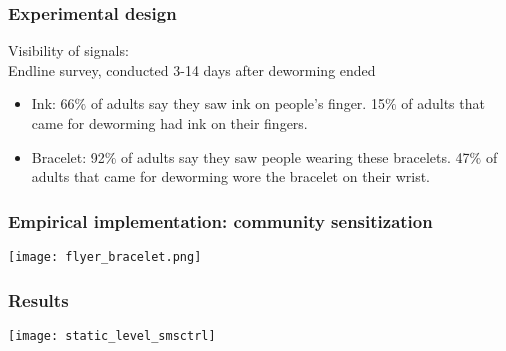 \documentclass{beamer}
\theoremstyle{plain}
\begin{document}
\begin{frame}[label=slide16]
\frametitle{\large{Experimental design}\rm}
Visibility of signals: \\
\bigskip
Endline survey, conducted 3-14 days after deworming ended %
\smallskip
\begin{itemize}
\item Ink: 66$\%$ of adults say they saw ink on people's finger. 15$\%$ of adults that came for deworming had ink on their fingers.
\smallskip
\item Bracelet: 92$\%$ of adults say they saw people wearing these bracelets. 47$\%$ of adults that came for deworming wore the bracelet on their wrist. 
\end{itemize}
\smallskip
\end{frame}

\begin{frame}[label=slide108]
\frametitle{\large{Empirical implementation: community sensitization}} 
\begin{center}
\texttt{[image: flyer\_bracelet.png]}
\end{center}
\end{frame}

\begin{frame}[label=slide17]
\frametitle{\large{Results}}
\begin{center}
\texttt{[image: static\_level\_smsctrl]}
\end{center}
\end{frame}
\end{document}
